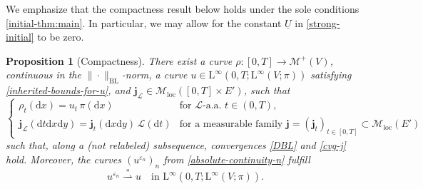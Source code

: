 \documentclass[11pt,reqno]{amsart}
\numberwithin{equation}{section}
\newcommand{\calM}{\mathcal{M}}
\newcommand{\scrL}{\mathscr{L}}
\newcommand{\eps}{\varepsilon}
\newcommand{\dd}{\mathrm{d}}
\newtheorem{proposition}[theorem]{Proposition}
\theoremstyle{definition}
\newcommand{\ep}{\varepsilon}
\let\eps\ep
\def\dd{\mathrm{d}}
\newcommand{\weaksto}{\stackrel*\rightharpoonup}
\newcommand{\Lebone}{\scrL}
\newcommand{\bj}{{\boldsymbol j}}
\newcommand{\Ed}{{E'}}
\newcommand{\Mloc}{\mathcal{M}_{\mathrm{loc}}}
\newcommand{\ej}{\eps_n}
\newcommand{\nbl}[1]{\|#1\|_{\mathrm{BL}} }
\newcommand{\rmL}{\mathrm{L}}
\newcommand{\RBS}{\color{black}} %
\newcommand{\RNEW}{\color{black}} %
\newcommand{\TODO}[1]{\todo[inline, color=cyan!20]{#1}}
\newcommand{\EEE}{\color{black}}
\numberwithin{equation}{section}
\begin{document}
 \RBS We emphasize that the compactness result below holds under the sole conditions \eqref{initial-thm:main}. In particular, we may allow for the constant $\underline{U}$ in 
 \eqref{strong-initial}  to be zero. \EEE
\begin{proposition}[Compactness]
\label{prop:compactness}
There exist  
a curve $\rho: [0,T]\to \calM^+(V)$, continuous in the $\nbl{\cdot}$-norm, \RNEW a curve  $u \in \rmL^\infty(0,T; \rmL^\infty(V; \pi))$
satisfying \eqref{inherited-bounds-for-u}, 
and  $\bj_\Lebone \in \Mloc([0,T]{\times}\Ed)$, 
such that 
\begin{equation}
\label{disintegration-props-rho-j}
\begin{cases}
\rho_t(\dd x) = u_t\,   \pi(\dd x)  & \text{for } \Lebone\text{-a.a.\ } t \in (0,T),
\\
\bj_\Lebone(\dd t \dd x \dd y) = \bj_t(\dd x \dd y) \,\Lebone(\dd t) & \text{for a measurable family } \bj = (\bj_t)_{t\in[0,T]} \subset \Mloc(E')
\end{cases}
\end{equation}
such that, along a (not relabeled) subsequence, convergences \eqref{DBL} and \eqref{cvg-j} hold. Moreover, the curves $(u^{\ej})_n$ from 
\eqref{absolute-continuity-n} fulfill
\begin{equation}
\label{added-cvg-u}
u^{\ej} \weaksto u \quad \text{in }  \rmL^\infty(0,T; \rmL^\infty(V; \pi)).
\end{equation}
\end{proposition}
\end{document}
